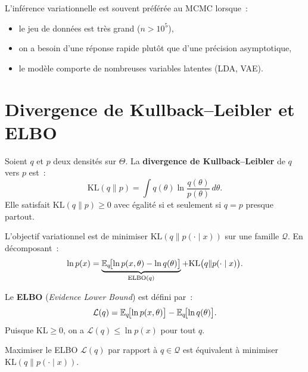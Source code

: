 \begin{remarque}
L'inf\'erence variationnelle est souvent pr\'ef\'er\'ee au MCMC lorsque~:
\begin{itemize}
  \item le jeu de donn\'ees est tr\`es grand ($n > 10^5$),
  \item on a besoin d'une r\'eponse rapide plut\^ot que d'une pr\'ecision asymptotique,
  \item le mod\`ele comporte de nombreuses variables latentes (LDA, VAE).
\end{itemize}
\end{remarque}

\section{Divergence de Kullback--Leibler et ELBO}

\begin{definition}[Divergence KL]
Soient $q$ et $p$ deux densit\'es sur $\Theta$. La \textbf{divergence de
Kullback--Leibler} de $q$ vers $p$ est~:
\[
  \mathrm{KL}(q \| p) = \int q(\theta) \ln \frac{q(\theta)}{p(\theta)}\,d\theta.
\]
Elle satisfait $\mathrm{KL}(q \| p) \geq 0$ avec \'egalit\'e si et seulement si
$q = p$ presque partout.
\end{definition}

L'objectif variationnel est de minimiser $\mathrm{KL}(q \| p(\cdot \mid x))$
sur une famille $\mathcal{Q}$. En d\'ecomposant~:
\[
  \ln p(x) = \underbrace{\mathbb{E}_q\!\bigl[\ln p(x, \theta) - \ln q(\theta)\bigr]}_{\mathrm{ELBO}(q)}
              + \mathrm{KL}\bigl(q \| p(\cdot \mid x)\bigr).
\]

\begin{definition}
Le \textbf{ELBO} (\emph{Evidence Lower Bound}) est d\'efini par~:
\[
  \mathcal{L}(q) = \mathbb{E}_q\!\bigl[\ln p(x, \theta)\bigr] - \mathbb{E}_q\!\bigl[\ln q(\theta)\bigr].
\]
Puisque $\mathrm{KL} \geq 0$, on a $\mathcal{L}(q) \leq \ln p(x)$ pour tout $q$.
\end{definition}

\begin{theoreme}
Maximiser le ELBO $\mathcal{L}(q)$ par rapport \`a $q \in \mathcal{Q}$ est
\'equivalent \`a minimiser $\mathrm{KL}(q \| p(\cdot \mid x))$.
\end{theoreme}

